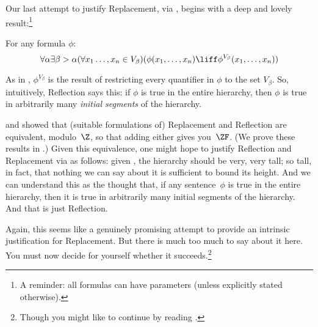 \documentclass[../../../include/open-logic-section]{subfiles}
\begin{document}

Our last attempt to justify Replacement, via \stagesinex, begins with a deep and lovely result:\footnote{A reminder: all formulas can have parameters (unless explicitly stated otherwise).}
\begin{thm}
For any formula $\phi$:
\[
\forall \alpha \exists \beta > \alpha (\forall x_1 \ldots, x_n \in
V_\beta)(\phi(x_1, \ldots, x_n) \liff \phi^{V_\beta}(x_1, \ldots, x_n))
\]
\end{thm}
\noindent 
As in , $\phi^{V_\beta}$ is the result of restricting every
quantifier in $\phi$ to the set $V_\beta$. So, intuitively, Reflection
says this: if $\phi$ is true in the entire hierarchy, then $\phi$ is
true in arbitrarily many \emph{initial segments} of the hierarchy. 

\citet{Montague1961} and \citet{Levy1960} showed that (suitable
formulations of) Replacement and Reflection are equivalent,
modulo~$\Z$, so that adding either gives you~$\ZF$. (We prove these results in .) Given this
equivalence, one might hope to justify Reflection  and Replacement via
\stagesinex{} as follows: given \stagesinex, the hierarchy should be
very, very tall; so tall, in fact, that nothing we can say about it is
sufficient to bound its height. And we can understand this as the
thought that, if any sentence~$\phi$ is true in the entire hierarchy,
then it is true in arbitrarily many initial segments of the hierarchy.
And that is just Reflection. 

Again, this seems like a genuinely promising attempt to provide an
intrinsic justification for Replacement. But there is much too much to
say about it here. You must now decide for yourself whether it
succeeds.\footnote{Though you might like to continue by reading \citet[95--100]{Incurvati2020}.}
\end{document}
